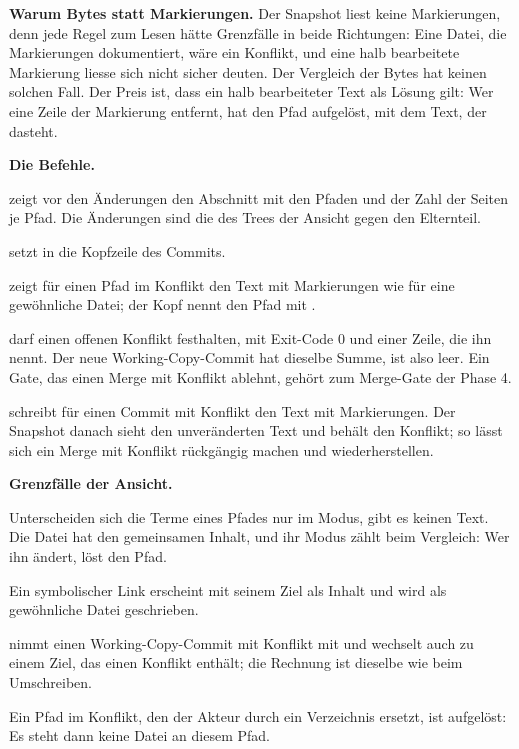 {\bf Warum Bytes statt Markierungen.} Der Snapshot liest keine Markierungen, denn jede Regel zum
Lesen hätte Grenzfälle in beide Richtungen: Eine Datei, die Markierungen dokumentiert, wäre
ein Konflikt, und eine halb bearbeitete Markierung liesse sich nicht sicher deuten.
Der Vergleich der Bytes hat keinen solchen Fall. Der Preis ist, dass ein halb bearbeiteter Text
als Lösung gilt: Wer eine Zeile der Markierung entfernt, hat den Pfad aufgelöst, mit dem
Text, der dasteht.

{\bf Die Befehle.}

\startitemize
\item {} zeigt vor den Änderungen den Abschnitt  mit den Pfaden und
der Zahl der Seiten je Pfad. Die Änderungen sind die des Trees der Ansicht gegen den Elternteil.
\item {} setzt  in die Kopfzeile des Commits.
\item {} zeigt für einen Pfad im Konflikt den Text mit Markierungen wie für eine
gewöhnliche Datei; der Kopf nennt den Pfad mit .
\item {} darf einen offenen Konflikt festhalten, mit Exit-Code 0 und einer Zeile,
die ihn nennt. Der neue Working-Copy-Commit hat dieselbe Summe, ist also leer.
Ein Gate, das einen Merge mit Konflikt ablehnt, gehört zum Merge-Gate der Phase 4.
\item {} schreibt für einen Commit mit Konflikt den Text mit Markierungen.
Der Snapshot danach sieht den unveränderten Text und behält den Konflikt;
so lässt sich ein Merge mit Konflikt rückgängig machen und wiederherstellen.
\stopitemize

\startinfobox
{\bf Grenzfälle der Ansicht.}
\startitemize
\item Unterscheiden sich die Terme eines Pfades nur im Modus, gibt es keinen Text. Die Datei hat
den gemeinsamen Inhalt, und ihr Modus zählt beim Vergleich: Wer ihn ändert, löst den Pfad.
\item Ein symbolischer Link erscheint mit seinem Ziel als Inhalt und wird als gewöhnliche
Datei geschrieben.
\item {} nimmt einen Working-Copy-Commit mit Konflikt mit und wechselt auch zu einem
Ziel, das einen Konflikt enthält; die Rechnung ist dieselbe wie beim Umschreiben.
\item Ein Pfad im Konflikt, den der Akteur durch ein Verzeichnis ersetzt, ist aufgelöst:
Es steht dann keine Datei an diesem Pfad.
\stopitemize
\stopinfobox

